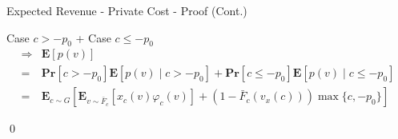 \documentclass{beamer}
\begin{document}
\begin{frame}{Expected Revenue - Private Cost - Proof (Cont.)}

  Case $c > -p_0$ + Case $c \leq -p_0$
  \begin{align*}
    \Rightarrow & \mathbf{E}\left[p(v)\right]                                                                                                            \\
    =           & \mathbf{Pr}[c > -p_0]\mathbf{E}\left[p(v) \mid c > -p_0\right] + \mathbf{Pr}[c \leq -p_0]\mathbf{E}\left[p(v) \mid c \leq -p_0\right]  \\
    =           & \mathbf{E}_{c \sim G}\left[\mathbf{E}_{v \sim \bar{F}_c}\left[x_c(v)\varphi_c(v)\right] + (1-\bar{F}_c(v_x(c))) \max\{c, -p_0\}\right]
  \end{align*}

  \qed
\end{frame}
\end{document}

